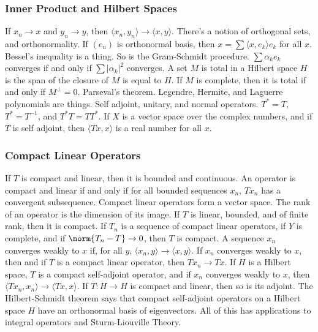 \documentclass[crop=false,class=book,oneside]{standalone}
\begin{document}
            \subsubsection{Inner Product and Hilbert Spaces}
                If $x_{n}\rightarrow{x}$ and $y_{n}\rightarrow{y}$,
                then
                $\langle{x_{n},y_{n}}\rangle\rightarrow\langle{x,y}\rangle$.
                There's a notion of orthogonal sets,
                and orthonormality. If $(e_{n})$ is orthonormal basis,
                then $x=\sum\langle{x,e_{k}}\rangle{e_{k}}$
                for all $x$.
                Bessel's inequality is a thing. So is the Gram-Schmidt
                procedure. $\sum\alpha_{k}e_{k}$
                converges if and only if
                $\sum|\alpha_{k}|^{2}$ converges. A set $M$ is total in
                a Hilbert space $H$ is the span of the closure
                of $M$ is equal
                to $H$. If $M$ is complete, then it is 
                total if and only if $M^{\perp}=0$. Parseval's theorem.
                Legendre, Hermite, and Laguerre polynomials are things.
                Self adjoint, unitary, and normal operators.
                $T^{*}=T$, $T^{*}=T^{-1}$, and $T^{*}T=TT^{*}$. If
                $X$ is a vector space over the complex numbers,
                and if $T$ is self adjoint, then
                $\langle{Tx,x}\rangle$ is a real number for all $x$.
            \subsubsection{Compact Linear Operators}
                If $T$ is compact and linear, then it is bounded and
                continuous. An operator is compact and linear if and only if
                for all bounded sequences $x_{n}$,
                $Tx_{n}$ has a convergent subsequence. Compact linear
                operators form a vector space. The rank of an
                operator is
                the dimension of its image. If $T$ is linear,
                bounded, and of finite rank, then it is compact.
                If $T_{n}$ is a sequence of compact linear
                operators, if $Y$ is
                complete, and if $\norm{T_{n}-T}\rightarrow{0}$, then
                $T$ is compact. A sequence $x_{n}$ converges weakly to
                $x$ if, for all $y$,
                $\langle{x_{n},y}\rangle\rightarrow\langle{x,y}\rangle$.
                If $x_{n}$ converges weakly to $x$, then
                and if $T$ is a compact linear operator, then
                $Tx_{n}\rightarrow{Tx}$. If $H$ is a Hilbert space,
                $T$ is a compact self-adjoint operator, and if
                $x_{n}$ converges weakly to $x$, then
                $\langle{Tx_{n},x_{n}}\rangle\rightarrow\langle{Tx,x}\rangle$.
                If $T:H\rightarrow{H}$ is compact and linear, then so
                is its adjoint. The Hilbert-Schmidt theorem says that
                compact self-adjoint operators on a Hilbert space $H$
                have an orthonormal basis of eigenvectors. All of this
                has applications to integral operators and
                Sturm-Liouville Theory.
\end{document}
